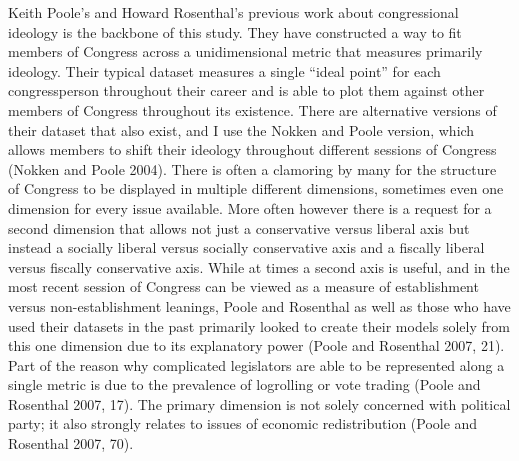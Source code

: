 \documentclass[12pt,twoside]{reedthesis}
\begin{document}
  Keith Poole's and Howard Rosenthal's previous work about congressional
  ideology is the backbone of this study. They have constructed a way to
  fit members of Congress across a unidimensional metric that measures
  primarily ideology. Their typical dataset measures a single ``ideal
  point'' for each congressperson throughout their career and is able to
  plot them against other members of Congress throughout its existence.
  There are alternative versions of their dataset that also exist, and I
  use the Nokken and Poole version, which allows members to shift their
  ideology throughout different sessions of Congress (Nokken and Poole
  2004). There is often a clamoring by many for the structure of Congress
  to be displayed in multiple different dimensions, sometimes even one
  dimension for every issue available. More often however there is a
  request for a second dimension that allows not just a conservative
  versus liberal axis but instead a socially liberal versus socially
  conservative axis and a fiscally liberal versus fiscally conservative
  axis. While at times a second axis is useful, and in the most recent
  session of Congress can be viewed as a measure of establishment versus
  non-establishment leanings, Poole and Rosenthal as well as those who
  have used their datasets in the past primarily looked to create their
  models solely from this one dimension due to its explanatory power
  (Poole and Rosenthal 2007, 21). Part of the reason why complicated
  legislators are able to be represented along a single metric is due to
  the prevalence of logrolling or vote trading (Poole and Rosenthal 2007,
  17). The primary dimension is not solely concerned with political party;
  it also strongly relates to issues of economic redistribution (Poole and
  Rosenthal 2007, 70).
  
\end{document}
